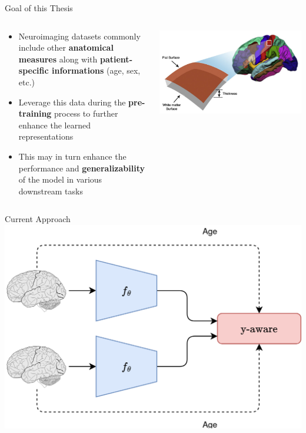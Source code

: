 \documentclass[12pt,aspectratio=169]{beamer}
\begin{document}
\begin{frame}{Goal of this Thesis}



\begin{columns}
    \begin{column}{.6\textwidth}
        
\begin{itemize}
    \item Neuroimaging datasets commonly include other \textbf{anatomical
    measures} along with \textbf{patient-specific informations} (age, sex, etc.)
    \item Leverage this data during the \textbf{pre-training} process to further
    enhance the learned representations
    \item This may in turn enhance the performance and \textbf{generalizability}
    of the model in various downstream tasks\\ 
\end{itemize}
    \end{column}
    \begin{column}{.4\textwidth}
        \includegraphics[width=\textwidth]{source/anatomical_measures.png}
    \end{column}
\end{columns}

\end{frame}

\begin{frame}{Current Approach}
    \centering
    \includegraphics[width=.5\textwidth]{source/yaware_summary.png}
\end{frame}
\end{document}
